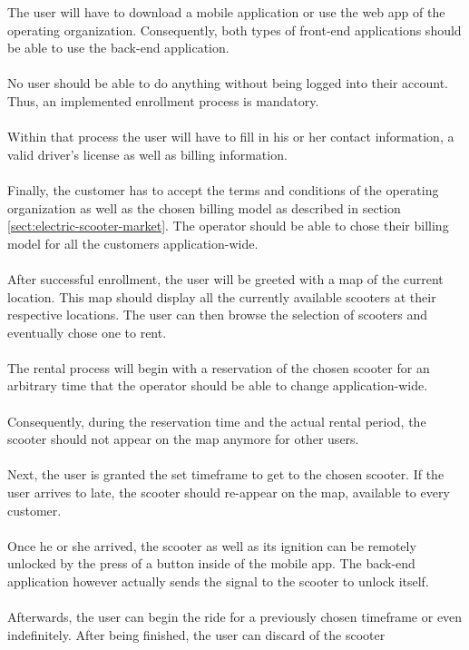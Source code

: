 \documentclass[12pt,a4paper,twoside]{report}
\begin{document}
The user will have to download a mobile application or use the web app
of the operating organization. Consequently, both types of front-end applications
should be able to use the back-end application.\\\\
No user should be able to do anything without being logged into their account.
Thus, an implemented enrollment process is mandatory.\\\\
Within that process the user will have to fill in his or her
contact information, a valid driver's license as well as billing information.\\\\
Finally, the customer has to accept the terms and conditions of the operating
organization as well as the chosen billing model as described in
section \ref{sect:electric-scooter-market}. The operator should be able to chose
their billing model for all the customers application-wide.\\\\
After successful enrollment, the user will be greeted with a map of the current
location. This map should display all the currently available scooters at
their respective locations. The user can then browse the selection
of scooters and eventually chose one to rent.\\\\
The rental process will begin with a reservation of the chosen scooter for
an arbitrary time that the operator should be able to change application-wide.\\\\
Consequently, during the reservation time and the actual rental period,
the scooter should not appear on the map anymore for other users.\\\\
Next, the user is granted the set timeframe to get to the chosen scooter.
If the user arrives to late, the scooter should re-appear on the map,
available to every customer.\\\\
Once he or she arrived, the scooter as well as its ignition can be remotely
unlocked by the press of a button inside of the mobile app.
The back-end application however actually sends the signal to the scooter to
unlock itself.\\\\
Afterwards, the user can begin the ride for a previously chosen timeframe
or even indefinitely. After being finished, the user can discard of the scooter
\end{document}
